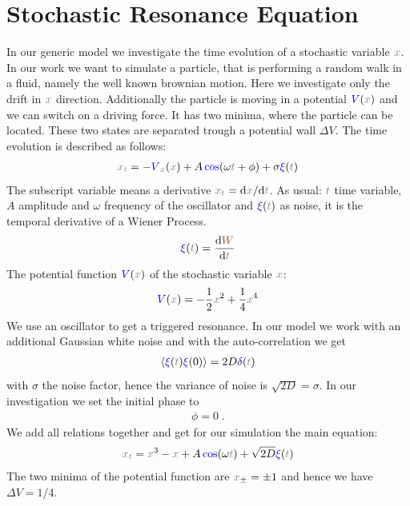 \documentclass[10pt,fleqn,%
reqno,a4paper]{article}
\makeatletter
\def\mathcolor#1#{\@mathcolor{#1}}
\def\@mathcolor#1#2#3{%
        \protect\leavevmode
        \begingroup\color#1{#2}#3\endgroup
}
\newcommand{\nx}{\mathcolor{gray}{x}}
\newcommand{\nt}{\mathcolor{gray}{t}}
\newcommand{\nW}{\mathcolor{brown!70!black}{W}}
\newcommand{\ncos}{\mathcolor{blue!70!black}{\cos}}
\newcommand{\nV}{\mathcolor{blue!70!black}{V}}
\newcommand{\nxi}{\mathcolor{blue!70!black}{\xi}}
\newcommand{\dif}{\mathrm{d}}
\newcommand{\ndelta}{\mathcolor{blue!70!black}{\delta}}
\makeatother
\begin{document}
\section{Stochastic Resonance Equation}
In our generic model we investigate the time evolution of a stochastic variable $ \nx $. 
In our work we want to simulate a particle, that is performing a random walk in a fluid, namely the well known brownian motion.
Here we investigate only the drift in $ \nx $ direction. 
Additionally the particle is moving in a potential $ \nV (\nx) $ and we can switch on a driving force.
It has two minima, where the particle can be located.
These two states are separated trough a potential wall $ \Delta V $. 
The time evolution is described as follows: 
\begin{align}
\nx _{\nt} = - \nV_{\nx} (\nx) + A\ncos (\omega \nt + \phi) + \sigma \nxi(\nt) \label{eq:StRe}
\end{align}
The subscript variable means a derivative $ \nx _{\nt} = \dif \nx/ \dif \nt $.
As usual: $ \nt $ time variable, $ A $ amplitude and $ \omega $ frequency of the oscillator and $ \nxi (\nt) $ as noise, it is the temporal derivative of a Wiener Process.
\begin{align}
	\nxi(\nt) = \frac{\dif \nW}{\dif \nt}
\end{align}
The potential function $ \nV (\nx) $ of the stochastic variable $ \nx $:
\begin{align*}
\nV (\nx) = -\frac{1}{2}\nx ^2 + \frac{1}{4} \nx ^4
\end{align*}
We use an oscillator to get a triggered resonance.
 In our model we work with an additional Gaussian white noise and with the auto-correlation we get
\begin{align}
        \langle \nxi (\nt) \nxi(0) \rangle = 2D \ndelta(\nt)
\end{align}
with $ \sigma $ the noise factor, hence the variance of noise is $ \sqrt{2D} = \sigma $.
 In our investigation we set the initial phase to
 \begin{align*}
	 \phi = 0 \; .
 \end{align*}
We add all relations together and get for our simulation the main equation:
\begin{align}
        \nx _{\nt} =\nx ^3 -\nx + A\ncos (\omega \nt) +  \sqrt{2D} \nxi(\nt) \label{eq:StReq1}
\end{align}
The two minima of the potential function are $ \nx _{\pm} = \pm 1 $ and hence we have $ \Delta V = 1/4 $.
\end{document}
